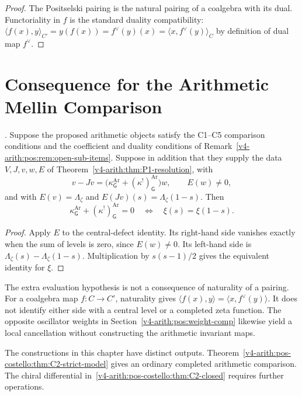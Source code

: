 \begin{proof}
The Positselski pairing is the natural pairing of a coalgebra
with its dual. Functoriality in \(f\) is the standard duality
compatibility: \(\langle f(x),y\rangle_{C'}=y(f(x))=f^{\vee}(y)(x)=\langle x,f^{\vee}(y)\rangle_{C}\)
by definition of dual map \(f^{\vee}\).
\end{proof}

\section{Consequence for the Arithmetic Mellin Comparison}
\label{v4-arith:pos-costello:P1-consequence}

\begin{theorem}
\label{v4-arith:pos-costello:thm:P1-unconditional}
\ClaimStatusProvedHereConditional.
Suppose the proposed arithmetic objects satisfy the C1--C5 comparison
conditions and the coefficient and duality conditions of
Remark~\ref{v4-arith:pos:rem:open-sub-items}.
Suppose in addition that they supply the data \(V,J,v,w,E\) of
Theorem~\ref{v4-arith:thm:P1-resolution}, with
\[
 v-Jv=\bigl(\kappa^{\mathrm{Ar}}_{\mathsf G}
       +(\kappa^!)^{\mathrm{Ar}}_{\mathsf G}\bigr)w,
 \qquad E(w)\ne0,
\]
and with \(E(v)=\Lambda_\zeta\) and
\(E(Jv)(s)=\Lambda_\zeta(1-s)\). Then
\begin{equation}
\label{v4-arith:pos-costello:eq:P1-full}
 \kappa^{\mathrm{Ar}}_{\mathsf G}+(\kappa^!)^{\mathrm{Ar}}_{\mathsf G}=0
 \quad\Longleftrightarrow\quad\xi(s)=\xi(1-s).
\end{equation}
\end{theorem}
\begin{proof}
Apply \(E\) to the central-defect identity. Its right-hand side
vanishes exactly when the sum of levels is zero, since \(E(w)\ne0\).
Its left-hand side is
\(\Lambda_\zeta(s)-\Lambda_\zeta(1-s)\).
Multiplication by \(s(s-1)/2\) gives the equivalent identity for
\(\xi\).
\end{proof}

The extra evaluation hypothesis is not a consequence of naturality
of a pairing. For a coalgebra map \(f:C\to C'\), naturality gives
\(\langle f(x),y\rangle=\langle x,f^\vee(y)\rangle\).
It does not identify either side with a central level or a completed
zeta function. The opposite oscillator weights in
Section~\ref{v4-arith:pos:weight-comp} likewise yield a local
cancellation without constructing the arithmetic invariant maps.

The constructions in this chapter have distinct outputs.
Theorem~\ref{v4-arith:pos-costello:thm:C2-strict-model} gives an
ordinary completed arithmetic comparison. The chiral differential
in~\ref{v4-arith:pos-costello:thm:C2-closed} requires further operations.

